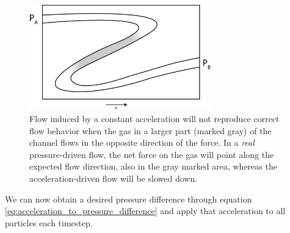 \begin{figure}[h]
\begin{center}
\includegraphics[width=0.7\textwidth, trim=0cm 0cm 0cm 0cm, clip]{DSMC/figures/gravity_problem.eps}
\end{center}
\caption{Flow induced by a constant acceleration will not reproduce correct flow behavior when the gas in a larger part (marked gray) of the channel flows in the opposite direction of the force. In a \textit{real} pressure-driven flow, the net force on the gas will point along the expected flow direction, also in the gray marked area, whereas the acceleration-driven flow will be slowed down.}
\label{fig:gravity_problem}
\end{figure}
We can now obtain a desired pressure difference through equation \eqref{eq:acceleration_to_pressure_difference} and apply that acceleration to all particles each timestep.